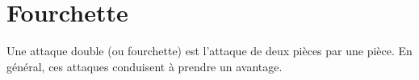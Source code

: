 
\section{Fourchette}

Une attaque double (ou fourchette) est l'attaque de deux pièces par une pièce. En général, ces attaques conduisent à prendre un avantage.

